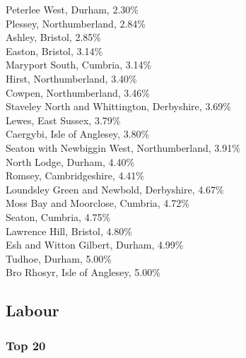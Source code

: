 \documentclass[a4paper,openany,10pt]{book}
\begin{document}
Peterlee West, Durham, 2.30\%\\
Plessey, Northumberland, 2.84\%\\
Ashley, Bristol, 2.85\%\\
Easton, Bristol, 3.14\%\\
Maryport South, Cumbria, 3.14\%\\
Hirst, Northumberland, 3.40\%\\
Cowpen, Northumberland, 3.46\%\\
Staveley North and Whittington, Derbyshire, 3.69\%\\
Lewes, East Sussex, 3.79\%\\
Caergybi, Isle of Anglesey, 3.80\%\\
Seaton with Newbiggin West, Northumberland, 3.91\%\\
North Lodge, Durham, 4.40\%\\
Romsey, Cambridgeshire, 4.41\%\\
Loundsley Green and Newbold, Derbyshire, 4.67\%\\
Moss Bay and Moorclose, Cumbria, 4.72\%\\
Seaton, Cumbria, 4.75\%\\
Lawrence Hill, Bristol, 4.80\%\\
Esh and Witton Gilbert, Durham, 4.99\%\\
Tudhoe, Durham, 5.00\%\\
Bro Rhosyr, Isle of Anglesey, 5.00\%\\

\subsection*{Labour}

\subsubsection*{Top 20}
\end{document}
